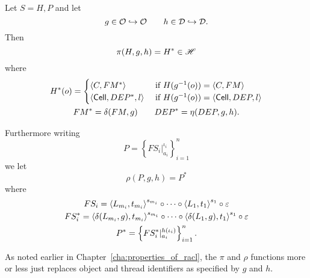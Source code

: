\begin{definition} \label{def:pirho}
  Let $S = H, P$ and let 
  \begin{equation*}
    g \in \mathcal{O} \hookrightarrow \mathcal{O} \quad\quad h \in \mathcal{D} \hookrightarrow \mathcal{D} .
  \end{equation*}
  Then 
  \begin{equation}
    \pi(H, g, h) = H^* \in \mathscr{H}
  \end{equation}
  where
  \begin{equation}
    \begin{gathered}
      H^*(o) =
      \begin{cases}
        \mbox{$\langle C, FM^* \rangle$}   & \text{ if } H(g^{-1}(o)) = \mbox{$\langle C, FM \rangle$} \\
        \mbox{$\langle \mbox{$\mathsf{Cell}$}{}, DEP^*, l \rangle$} & \text{ if } H(g^{-1}(o)) = \mbox{$\langle \mbox{$\mathsf{Cell}$}{}, DEP, l \rangle$}
      \end{cases} \\
      FM^* = \delta(FM, g) \quad\quad DEP^* = \eta(DEP, g, h).
    \end{gathered}
  \end{equation}

  Furthermore writing
  \begin{equation}
    P = \left\{ FS_i|_{a_i}^{\iota_i} \right\}_{i = 1}^n
  \end{equation}
  we let
  \begin{equation*}
    \rho(P, g, h) = P^*
  \end{equation*}
  where
  \begin{equation*}
    \begin{gathered}
      FS_i = \mbox{$\langle L_{m_i}, t_{m_i} \rangle$}^{s_{m_i}} \circ \dots \circ \mbox{$\langle L_1,
      t_1 \rangle$}^{s_1} \circ \varepsilon \\
      FS_i^* = \mbox{$\langle \delta(L_{m_i}, g), t_{m_i} \rangle$}^{s_{m_i}} \circ \dots \circ
      \mbox{$\langle \delta(L_1,g), t_1 \rangle$}^{s_1} \circ \varepsilon \\
      P^* = \left\{ FS_i^*|_{a_i}^{h(\iota_i)} \right\}_{i = 1}^n.
    \end{gathered}
  \end{equation*}
\end{definition}

\begin{remark}
  As noted earlier in Chapter~\ref{cha:properties_of_racl}, the $\pi$ and $\rho$
  functions more or less just replaces object and thread identifiers as
  specified by $g$ and $h$.
\end{remark}



